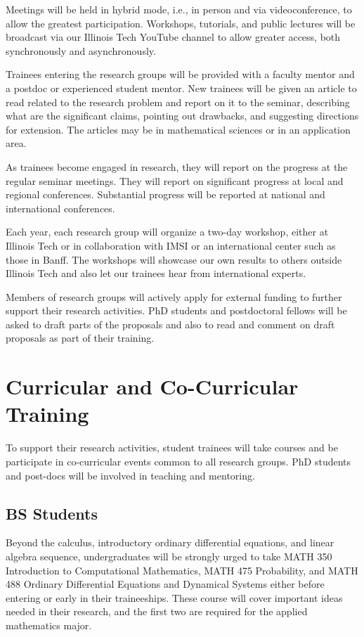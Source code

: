 \documentclass[11pt]{NSFamsart}
\begin{document}
Meetings will be held in hybrid mode, i.e., in person and via videoconference, to allow the greatest participation.  Workshops, tutorials, and public lectures will be broadcast via our Illinois Tech YouTube channel to allow greater access, both synchronously and asynchronously.

Trainees entering the research groups will be provided with a faculty mentor and a postdoc or experienced student mentor.  New trainees will be given an article to read related to the research problem and report on it to the seminar, describing what are the significant claims, pointing out drawbacks, and suggesting directions for extension. The articles may be in mathematical sciences or in an application area.

As trainees become engaged in research, they will report on the progress at the regular seminar meetings. They will report on significant progress at local and regional conferences.  Substantial progress will be reported at national and international conferences.

Each year, each research group will organize a two-day workshop, either at Illinois Tech or in collaboration with IMSI or an international center such as those in Banff.  The workshops will showcase our own results to others outside Illinois Tech and also let our trainees hear from international experts.

Members of research groups will actively apply for external funding to further support their research activities.  PhD students and postdoctoral fellows will be asked to draft parts of the proposals and also to read and comment on draft proposals as part of their training.

\section{Curricular and Co-Curricular Training}
To support their research activities, student trainees will take courses and be participate in co-curricular events common to all research groups.  PhD students and post-docs will be involved in teaching and mentoring. 

\subsection*{BS Students}

Beyond the calculus, introductory ordinary differential equations, and linear algebra sequence, undergraduates will be strongly urged to take MATH 350 Introduction to Computational Mathematics, MATH 475 Probability, and MATH 488 Ordinary Differential Equations and Dynamical Systems either before entering or early in their traineeships.  These course will cover important ideas needed in their research, and the first two are required for the applied mathematics major.  
\end{document}

